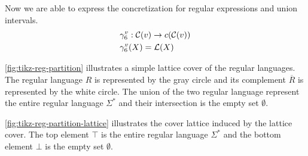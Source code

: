 Now we are able to express the concretization for regular expressions and union intervals.
\begin{align}
    &\gamma^v_6 : \mathcal{C}(v) \rightarrow c(\mathcal{C}(v)) \\
    &\gamma^v_6(X) = \mathcal{L}(X)
\end{align}

%


\begin{example}
    \autoref{fig:tikz-reg-partition} illustrates a simple lattice cover of the regular languages.
    The regular language $R$ is represented by the gray circle and its complement $\overline{R}$ is represented by the white circle.
    The union of the two regular language represent the entire regular language $\Sigma^*$ and their intersection is the empty set $\emptyset$.

    \autoref{fig:tikz-reg-partition-lattice} illustrates the cover lattice induced by the lattice cover.
    The top element $\top$ is the entire regular language $\Sigma^*$ and the bottom element $\bot$ is the empty set $\emptyset$.
\end{example}

